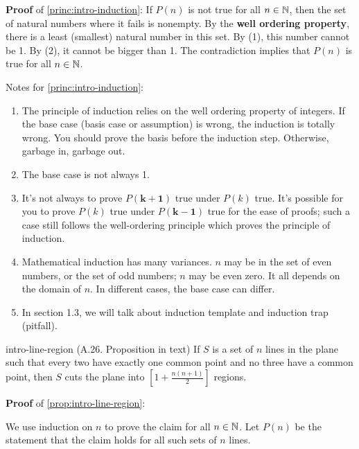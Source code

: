 \documentclass[../src/handouts/main.tex]{subfiles}
\begin{document}
\textbf{Proof} of \cref{princ:intro-induction}:
If $P(n)$ is not true for all $n \in \mathbb{N}$, then the set of natural numbers where it fails is nonempty.
By the \textbf{well ordering property}, there is a least (smallest) natural number in this set.
By (1), this number cannot be 1.
By (2), it cannot be bigger than 1.
The contradiction implies that $P(n)$ is true for all $n \in \mathbb{N}$.

Notes for \cref{princ:intro-induction}:
\begin{enumerate}
  \item The principle of induction relies on the well ordering property of integers. If the base case (basis case or assumption) is wrong, the induction is totally wrong. You should prove the basis before the induction step. Otherwise, garbage in, garbage out.
  \item The base case is not always 1.
  \item It's not always to prove $P(\bm{k + 1})$ true under $P(k)$ true. It's possible for you to prove $P(k)$ true under $P(\bm{k - 1})$ true for the ease of proofs; such a case still follows the well-ordering principle which proves the principle of induction.
  \item Mathematical induction has many variances. $n$ may be in the set of even numbers, or the set of odd numbers; $n$ may be even zero. It all depends on the domain of $n$. In different cases, the base case can differ.
  \item In section 1.3, we will talk about induction template and induction trap (pitfall).  %
\end{enumerate}

\begin{proposition}{}{intro-line-region}
  (A.26. Proposition in text)
  If $S$ is a set of $n$ lines in the plane such that every two have exactly one common point and no three have a common point, then $S$ cuts the plane into $\left[ 1 + \frac{n (n + 1)}{2} \right]$ regions.
\end{proposition}

\textbf{Proof} of \cref{prop:intro-line-region}:

We use induction on $n$ to prove the claim for all $n \in \mathbb{N}$.
Let $P(n)$ be the statement that the claim holds for all such sets of $n$ lines.
\end{document}
